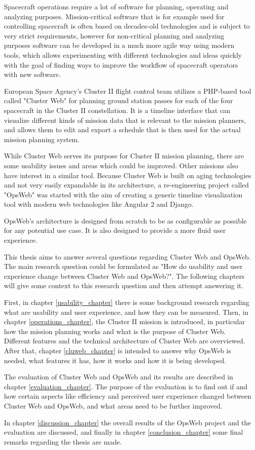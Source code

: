 Spacecraft operations require a lot of software for planning, operating and analyzing purposes. Mission-critical software that is for example used for controlling spacecraft is often based on decades-old technologies and is subject to very strict requirements, however for non-critical planning and analyzing purposes software can be developed in a much more agile way using modern tools, which allows experimenting with different technologies and ideas quickly with the goal of finding ways to improve the workflow of spacecraft operators with new software.

European Space Agency's Cluster II flight control team utilizes a PHP-based tool called "Cluster Web" for planning ground station passes for each of the four spacecraft in the Cluster II constellation. It is a timeline interface that can visualize different kinds of mission data that is relevant to the mission planners, and allows them to edit and export a schedule that is then used for the actual mission planning system.

While Cluster Web serves its purpose for Cluster II mission planning, there are some usability issues and areas which could be improved. Other missions also have interest in a similar tool. Because Cluster Web is built on aging technologies and not very easily expandable in its architecture, a re-engineering project called "OpsWeb" was started with the aim of creating a generic timeline visualization tool with modern web technologies like Angular 2 and Django.

OpsWeb's architecture is designed from scratch to be as configurable as possible for any potential use case. It is also designed to provide a more fluid user experience.

This thesis aims to answer several questions regarding Cluster Web and OpsWeb. The main research question could be formulated as "How do usability and user experience change between Cluster Web and OpsWeb?". The following chapters will give some context to this research question and then attempt answering it.

First, in chapter \ref{usability_chapter} there is some background research regarding what are usability and user experience, and how they can be measured. Then, in chapter \ref{operations_chapter}, the Cluster II mission is introduced, in particular how the mission planning works and what is the purpose of Cluster Web. Different features and the technical architecture of Cluster Web are overviewed. After that, chapter \ref{cluweb_chapter} is intended to answer why OpsWeb is needed, what features it has, how it works and how it is being developed.

The evaluation of Cluster Web and OpsWeb and its results are described in chapter \ref{evaluation_chapter}. The purpose of the evaluation is to find out if and how certain aspects like efficiency and perceived user experience changed between Cluster Web and OpsWeb, and what areas need to be further improved. 

In chapter \ref{discussion_chapter} the overall results of the OpsWeb project and the evaluation are discussed, and finally in chapter \ref{conclusion_chapter} some final remarks regarding the thesis are made.
